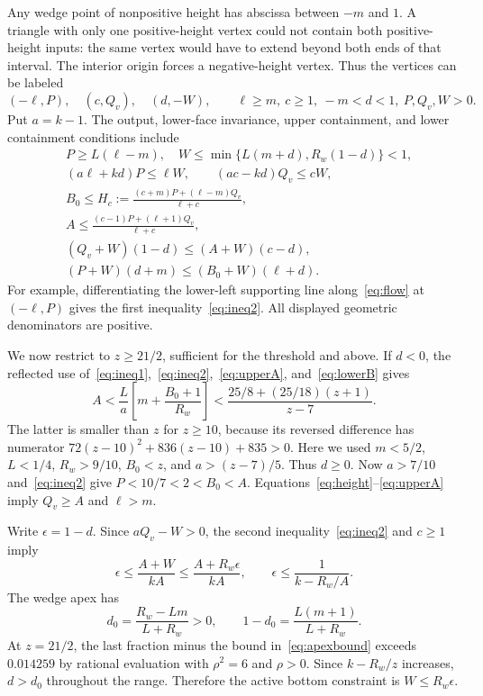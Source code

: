 Any wedge point of nonpositive height has abscissa between $-m$ and $1$. A triangle with only one positive-height vertex could not contain both positive-height inputs: the same vertex would have to extend beyond both ends of that interval. The interior origin forces a negative-height vertex. Thus the vertices can be labeled
\begin{equation}
 (-\ell,P),\quad(c,Q_v),\quad(d,-W),\qquad
 \ell\ge m,\ c\ge1,\ -m<d<1,\ P,Q_v,W>0.\label{eq:vertices}
\end{equation}
Put $a=k-1$. The output, lower-face invariance, upper containment, and lower containment conditions include
\begin{align}
 &P\ge L(\ell-m),\quad W\le\min\{L(m+d),R_w(1-d)\}<1,\label{eq:ineq1}\\
 &(a\ell+kd)P\le\ell W,\qquad(ac-kd)Q_v\le cW,\label{eq:ineq2}\\
 &B_0\le H_c:=\frac{(c+m)P+(\ell-m)Q_v}{\ell+c},\label{eq:height}\\
 &A\le\frac{(c-1)P+(\ell+1)Q_v}{\ell+c},\label{eq:upperA}\\
 &(Q_v+W)(1-d)\le(A+W)(c-d),\label{eq:lowerA}\\
 &(P+W)(d+m)\le(B_0+W)(\ell+d).\label{eq:lowerB}
\end{align}
For example, differentiating the lower-left supporting line along~\eqref{eq:flow} at $(-\ell,P)$ gives the first inequality~\eqref{eq:ineq2}. All displayed geometric denominators are positive.

We now restrict to $z\ge21/2$, sufficient for the threshold and above. If $d<0$, the reflected use of~\eqref{eq:ineq1},~\eqref{eq:ineq2},~\eqref{eq:upperA}, and~\eqref{eq:lowerB} gives
\begin{equation}
 A<\frac{L}{a}\left[m+\frac{B_0+1}{R_w}\right]
 <\frac{25/8+(25/18)(z+1)}{z-7}.
\end{equation}
The latter is smaller than $z$ for $z\ge10$, because its reversed difference has numerator
$72(z-10)^2+836(z-10)+835>0$. Here we used $m<5/2$, $L<1/4$, $R_w>9/10$, $B_0<z$, and $a>(z-7)/5$. Thus $d\ge0$. Now $a>7/10$ and~\eqref{eq:ineq2} give $P<10/7<2<B_0<A$. Equations~\eqref{eq:height}--\eqref{eq:upperA} imply $Q_v\ge A$ and $\ell>m$.

Write $\epsilon=1-d$. Since $aQ_v-W>0$, the second inequality~\eqref{eq:ineq2} and $c\ge1$ imply
\begin{equation}
 \epsilon\le\frac{A+W}{kA}\le\frac{A+R_w\epsilon}{kA},\qquad
 \epsilon\le\frac1{k-R_w/A}.\label{eq:apexbound}
\end{equation}
The wedge apex has
\begin{equation}
 d_0=\frac{R_w-Lm}{L+R_w}>0,\qquad
 1-d_0=\frac{L(m+1)}{L+R_w}.
\end{equation}
At $z=21/2$, the last fraction minus the bound in~\eqref{eq:apexbound} exceeds $0.014259$ by rational evaluation with $\rho^2=6$ and $\rho>0$. Since $k-R_w/z$ increases, $d>d_0$ throughout the range. Therefore the active bottom constraint is $W\le R_w\epsilon$.

